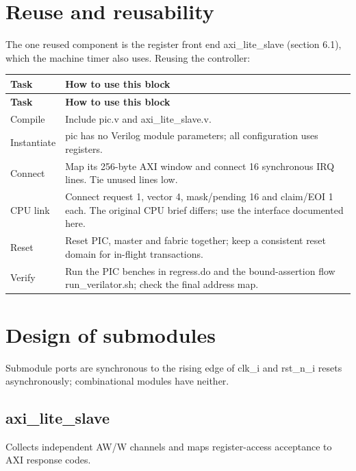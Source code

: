 \documentclass[11pt]{article}
\begin{document}
\clearpage
\section{Reuse and reusability}
\noindent The one reused component is the register front end axi\_lite\_slave (section 6.1), which the machine timer also uses. Reusing the controller:\par\medskip
{\small
\begin{longtable}{@{}L{0.2500\dimexpr\linewidth-12pt\relax}L{0.7500\dimexpr\linewidth-12pt\relax}@{}}
\toprule
\textbf{Task} & \textbf{How to use this block} \\ \midrule
\endfirsthead
\toprule
\textbf{Task} & \textbf{How to use this block} \\ \midrule
\endhead
Compile & Include pic.v and axi\_lite\_slave.v. \\ \addlinespace[3pt]
Instantiate & pic has no Verilog module parameters; all configuration uses registers. \\ \addlinespace[3pt]
Connect & Map its 256-byte AXI window and connect 16 synchronous IRQ lines. Tie unused lines low. \\ \addlinespace[3pt]
CPU link & Connect request 1, vector 4, mask/pending 16 and claim/EOI 1 each. The original CPU brief differs; use the interface documented here. \\ \addlinespace[3pt]
Reset & Reset PIC, master and fabric together; keep a consistent reset domain for in-flight transactions. \\ \addlinespace[3pt]
Verify & Run the PIC benches in regress.do and the bound-assertion flow run\_verilator.sh; check the final address map. \\*
\bottomrule\end{longtable}}

\clearpage
\section{Design of submodules}
\noindent Submodule ports are synchronous to the rising edge of clk\_i and rst\_n\_i resets asynchronously; combinational modules have neither.\par\medskip
{}
\subsection{axi\_lite\_slave}
Collects independent AW/W channels and maps register-access acceptance to AXI response codes.
\end{document}
